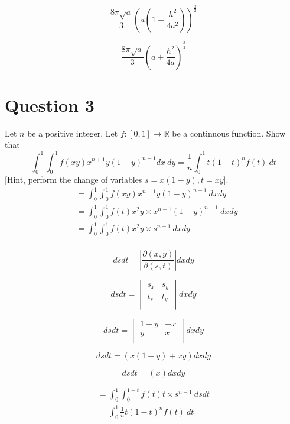 \documentclass[12pt]{article}
\begin{document}
$$
	 \frac{8\pi\sqrt{a}}{3} \left(  a\left( 1+\frac{h^2}{4a^2} \right) \right)^{\frac{3}{2}}
$$

$$
	 \frac{8\pi\sqrt{a}}{3} \left(  a + \frac{h^2}{4a} \right)^{\frac{3}{2}}
$$
\section*{Question 3}
Let $n$ be a positive integer. Let $f:[0,1]\rightarrow\mathbb{R}$ be a continuous function. Show that
$$
\int_{0}^{1}\int_{0}^{1}f(xy)x^{n+1}y(1-y)^{n-1}dx \ dy = \frac{1}{n}\int_{0}^{1}t(1-t)^{n}f(t)\ dt
$$
[Hint, perform the change of variables $s=x(1-y),t=xy$].
\begin{align*}
	&=\int_{0}^{1}\int_{0}^{1}f(xy)x^{n+1}y(1-y)^{n-1} \ dxdy \\
	&=\int_{0}^{1}\int_{0}^{1}f(t)x^2y\times x^{n-1}(1-y)^{n-1} \ dxdy \\
	&=\int_{0}^{1}\int_{0}^{1}f(t)x^2y\times s^{n-1} \ dxdy \\
\end{align*}

$$
	dsdt=\left| \frac{\partial(x,y)}{\partial(s,t)} \right|dxdy
$$

$$
dsdt=
\begin{vmatrix}
	s_x & s_y \\
	t_s & t_y \\
\end{vmatrix}
dxdy
$$

$$
dsdt=
\begin{vmatrix}
	1-y & -x \\
	y & x \\
\end{vmatrix}
dxdy
$$

$$
dsdt=
(x(1-y)+xy)
dxdy
$$

$$
dsdt=
(x)
dxdy
$$

\begin{align*}
	=\int_{0}^{1}\int_{0}^{1-t}f(t)t \times s^{n-1} \ dsdt \\
	=\int_{0}^{1}\frac{1}{n}t(1-t)^nf(t) \ dt \\
\end{align*}
\end{document}
